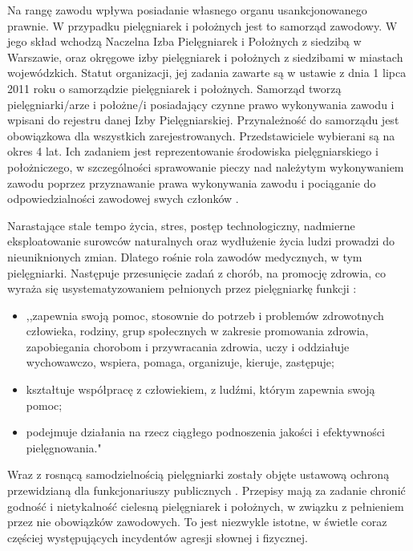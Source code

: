 \documentclass[a4paper,12pt,twoside,openright]{mwrep}
\begin{document}
Na rangę zawodu wpływa posiadanie własnego organu usankcjonowanego prawnie. W przypadku pielęgniarek i położnych jest to samorząd zawodowy. W jego skład wchodzą Naczelna Izba Pielęgniarek i Położnych z siedzibą w Warszawie, oraz okręgowe izby pielęgniarek i położnych z siedzibami w miastach wojewódzkich. Statut organizacji, jej zadania zawarte są w ustawie z dnia 1 lipca 2011 roku o samorządzie pielęgniarek i położnych. Samorząd tworzą pielęgniarki/arze i położne/i posiadający czynne prawo wykonywania zawodu i wpisani do rejestru danej Izby Pielęgniarskiej. Przynależność do samorządu jest obowiązkowa dla wszystkich zarejestrowanych. Przedstawiciele wybierani są na okres 4 lat. Ich zadaniem jest reprezentowanie środowiska pielęgniarskiego i położniczego, w szczególności sprawowanie pieczy nad należytym wykonywaniem zawodu poprzez przyznawanie prawa wykonywania zawodu i pociąganie do odpowiedzialności zawodowej swych członków \cite{nipip}.

Narastające stale tempo życia, stres, postęp technologiczny, nadmierne eksploatowanie surowców naturalnych oraz wydłużenie życia ludzi prowadzi do nieuniknionych zmian. Dlatego rośnie rola zawodów medycznych, w tym pielęgniarki. Następuje przesunięcie zadań z chorób, na promocję zdrowia, co wyraża się usystematyzowaniem pełnionych przez pielęgniarkę funkcji :
\begin{itemize}
	\item ,,zapewnia swoją pomoc, stosownie do potrzeb i problemów zdrowotnych człowieka, rodziny, grup społecznych w zakresie promowania zdrowia, zapobiegania chorobom i przywracania zdrowia, uczy i oddziałuje wychowawczo, wspiera, pomaga, organizuje, kieruje, zastępuje;
	\item kształtuje współpracę z człowiekiem, z ludźmi, którym zapewnia swoją pomoc;
	\item podejmuje działania na rzecz ciągłego podnoszenia jakości i efektywności pielęgnowania."
\end{itemize}

Wraz z rosnącą samodzielnością pielęgniarki zostały objęte ustawową ochroną przewidzianą dla funkcjonariuszy publicznych \cite{prawo}. Przepisy mają za zadanie chronić godność i nietykalność cielesną pielęgniarek i położnych, w związku z pełnieniem przez nie obowiązków zawodowych. To jest niezwykle istotne, w świetle coraz częściej występujących incydentów agresji słownej i fizycznej.
\end{document}
